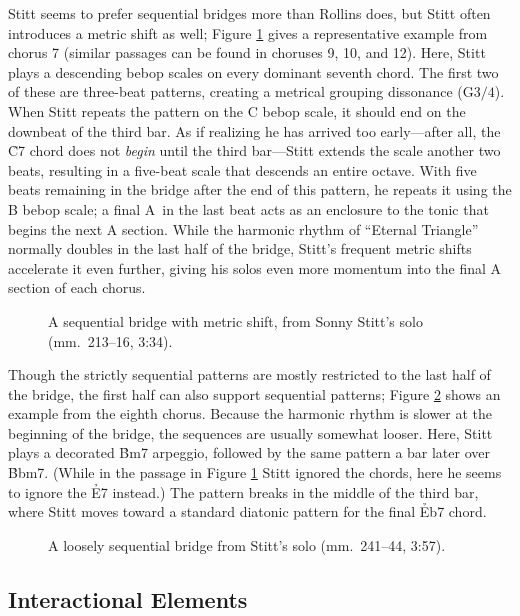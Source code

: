 Stitt seems to prefer sequential bridges more than Rollins does, but Stitt
often introduces a metric shift as well; Figure \ref{et:ss-bridge-shift} gives
a representative example from chorus 7 (similar passages can be found in
choruses 9, 10, and 12). Here, Stitt plays a descending bebop scales on every
dominant seventh chord. The first two of these are three-beat patterns,
creating a metrical grouping dissonance (G$3/4$). When Stitt repeats
the pattern on the C bebop scale, it should end on the downbeat of the third
bar. As if realizing he has arrived too early---after all, the \h{C7} chord
does not \emph{begin} until the third bar---Stitt extends the scale another
two beats, resulting in a five-beat scale that descends an entire octave. With
five beats remaining in the bridge after the end of this pattern, he repeats
it using the B bebop scale; a final A\nat\ in the last beat acts as an
enclosure to the tonic \Bflat that begins the next A section. While the
harmonic rhythm of ``Eternal Triangle'' normally doubles in the last half of
the bridge, Stitt's frequent metric shifts accelerate it even further, giving
his solos even more momentum into the final A section of each chorus.

\begin{figure}[tbp]
  \caption[A sequential bridge with metric shift from Sonny Stitt's solo.]{%
    A sequential bridge with metric shift, from Sonny Stitt's solo
    (mm.~213--16, 3:34).}
  \label{et:ss-bridge-shift}
\end{figure}

Though the strictly sequential patterns are mostly restricted to the last half
of the bridge, the first half can also support sequential patterns; Figure
\ref{et:ss-seq-first-half} shows an example from the eighth chorus. Because
the harmonic rhythm is slower at the beginning of the bridge, the sequences
are usually somewhat looser. Here, Stitt plays a decorated \h{Bm7} arpeggio,
followed by the same pattern a bar later over \h{Bbm7}. (While in the passage
in Figure \ref{et:ss-bridge-shift} Stitt ignored the \ii chords, here he seems
to ignore the \h{E7} instead.) The pattern breaks in the middle of the third
bar, where Stitt moves toward a standard diatonic pattern for the final
\h{Eb7} chord.

\begin{figure}[tbp]
  \caption[A loosely sequential bridge from Stitt's solo.]{%
    A loosely sequential bridge from Stitt's solo (mm.~241--44, 3:57).}
  \label{et:ss-seq-first-half}
\end{figure}

\FloatBarrier
\subsection{Interactional Elements}

